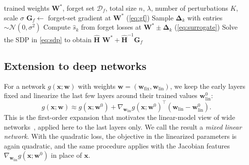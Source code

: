 \documentclass[10pt,twocolumn,letterpaper]{article}
\newcommand{\Hhat}{\widehat{\mathbf{H}}}
\newcommand{\Wstar}{\mathbf{W}^{*}}
\newcommand{\Df}{\mathcal{D}_f}
\begin{document}
\begin{algorithm}[t]
\caption{Source-free Newton unlearning}
\label{alg:sf}
\begin{algorithmic}[1]
\Require trained weights $\Wstar$, forget set $\Df$, total size $n$, $\lambda$, number of perturbations $K$, scale $\sigma$
\State $\mathbf{G}_f\gets$ forget-set gradient at $\Wstar$ (\cref{eq:gf})
  \State Sample $\boldsymbol{\Delta}_k$ with entries $\sim\mathcal{N}(0,\sigma^2)$
  \State Compute $\hat{s}_k$ from forget losses at $\Wstar\pm\boldsymbol{\Delta}_k$ (\cref{eq:surrogate})
\EndFor
\State Solve the SDP in \cref{eq:sdp} to obtain $\Hhat$
\State \Return $\Wstar+\Hhat^{-1}\mathbf{G}_f$
\end{algorithmic}
\end{algorithm}

\subsection{Extension to deep networks}
\label{sec:mixed}
For a network $g(\mathbf{x};\mathbf{w})$ with weights $\mathbf{w}=(\mathbf{w}_{\text{fix}},\mathbf{w}_{\text{lin}})$, we keep the early layers fixed and linearize the last few layers around their trained values $\mathbf{w}_{\text{lin}}^{0}$:
\begin{equation}
  g(\mathbf{x};\mathbf{w})\approx g(\mathbf{x};\mathbf{w}^{0})+\nabla_{\mathbf{w}_{\text{lin}}}g(\mathbf{x};\mathbf{w}^{0})^\top(\mathbf{w}_{\text{lin}}-\mathbf{w}_{\text{lin}}^{0}).
\end{equation}
This is the first-order expansion that motivates the linear-model view of wide networks~\cite{lee2019wide}, applied here to the last layers only. We call the result a \emph{mixed linear network}. With the quadratic loss, the objective in the linearized parameters is again quadratic, and the same procedure applies with the Jacobian features $\nabla_{\mathbf{w}_{\text{lin}}}g(\mathbf{x};\mathbf{w}^0)$ in place of $\mathbf{x}$.
\end{document}
